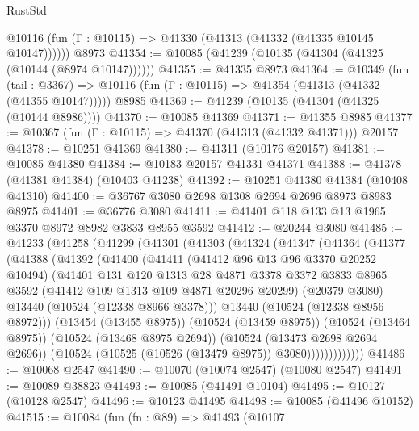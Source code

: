 \begin{lexlean}{RustStd}
\begin{coremodule}
      @10116 (fun (Γ : @10115) => @41330 (@41313 (@41332 (@41335 @10145 @10147))))))
    @8973
@41354 := @10085 (@41239 (@10135 (@41304 (@41325 (@10144 (@8974 @10147))))))
@41355 := @41335 @8973
@41364 := @10349
    (fun (tail : @3367) => @10116 (fun (Γ : @10115) => @41354 (@41313 (@41332 (@41355 @10147)))))
    @8985
@41369 := @41239 (@10135 (@41304 (@41325 (@10144 @8986))))
@41370 := @10085 @41369
@41371 := @41355 @8985
@41377 := @10367 (fun (Γ : @10115) => @41370 (@41313 (@41332 @41371))) @20157
@41378 := @10251 @41369
@41380 := @41311 (@10176 @20157)
@41381 := @10085 @41380
@41384 := @10183 @20157 @41331 @41371
@41388 := @41378 (@41381 @41384) (@10403 @41238)
@41392 := @10251 @41380 @41384 (@10408 @41310)
@41400 := @36767 @3080 @2698 @1308 @2694 @2696 @8973 @8983 @8975
@41401 := @36776 @3080
@41411 := @41401 @118 @133 @13 @1965 @3370 @8972 @8982 @3833 @8955 @3592
@41412 := @20244 @3080
@41485 := @41233
    (@41258
      (@41299
        (@41301
          (@41303
            (@41324
              (@41347
                (@41364
                  (@41377
                    (@41388
                      (@41392
                        (@41400
                          (@41411
                            (@41412 @96 @13 @96 @3370 @20252 @10494)
                            (@41401
                              @131
                              @120
                              @1313
                              @28
                              @4871
                              @3378
                              @3372
                              @3833
                              @8965
                              @3592
                              (@41412 @109 @1313 @109 @4871 @20296 @20299)
                              (@20379 @3080)
                              @13440
                              (@10524 (@12338 @8966 @3378)))
                            @13440
                            (@10524 (@12338 @8956 @8972)))
                          (@13454 (@13455 @8975))
                          (@10524 (@13459 @8975))
                          (@10524 (@13464 @8975))
                          (@10524 (@13468 @8975 @2694))
                          (@10524 (@13473 @2698 @2694 @2696))
                          (@10524 (@10525 (@10526 (@13479 @8975)) @3080)))))))))))))
@41486 := @10068 @2547
@41490 := @10070 (@10074 @2547) (@10080 @2547)
@41491 := @10089 @38823
@41493 := @10085 (@41491 @10104)
@41495 := @10127 (@10128 @2547)
@41496 := @10123 @41495
@41498 := @10085 (@41496 @10152)
@41515 := @10084
    (fun (fn : @89) =>
    @41493
      (@10107

\end{coremodule}
\end{lexlean}
